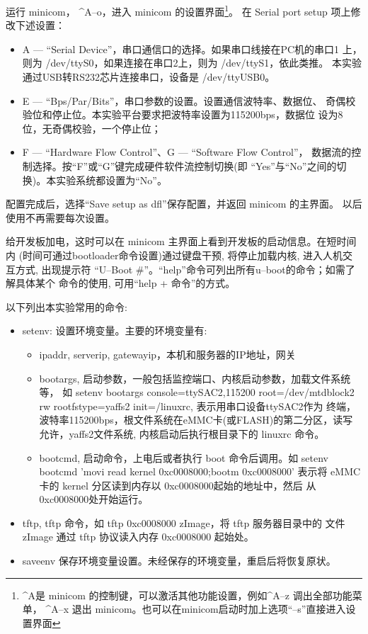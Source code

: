     运行 minicom， \^{}A--o，进入 minicom 的设置界面\footnote{\^{}A是
minicom 的控制键，可以激活其他功能设置，例如\^{}A--z 调出全部功能菜单，
\^{}A--x 退出 minicom。也可以在minicom启动时加上选项``--s''直接进入设置界面}。
在 Serial port setup 项上修改下述设置：
\begin{itemize}\itemsep=-3pt
  \item A --- ``Serial Device''，串口通信口的选择。如果串口线接在PC机的串口1
		上，则为 /dev/ttyS0，如果连接在串口2上，则为 /dev/ttyS1，依此类推。
		本实验通过USB转RS232芯片连接串口，设备是 /dev/ttyUSB0。
  \item E --- ``Bps/Par/Bits''，串口参数的设置。设置通信波特率、数据位、
		奇偶校验位和停止位。本实验平台要求把波特率设置为115200bps，数据位
		设为8位，无奇偶校验，一个停止位；
  \item F --- ``Hardware Flow Control''、G --- ``Software Flow Control''，
		数据流的控制选择。按``F''或``G''键完成硬件软件流控制切换(即
		``Yes''与``No''之间的切换)。本实验系统都设置为``No''。
\end{itemize}

	配置完成后，选择``Save setup as dfl''保存配置，并返回 minicom 的主界面。
以后使用不再需要每次设置。

	给开发板加电，这时可以在 minicom 主界面上看到开发板的启动信息。在短时间内
(时间可通过bootloader命令设置)通过键盘干预, 将停止加载内核, 进入人机交互方式,
出现提示符 ``U--Boot \#''。``help''命令可列出所有u--boot的命令；如需了解具体某个
命令的使用, 可用``help + 命令''的方式。

	以下列出本实验常用的命令:
\begin{itemize}
  \item setenv: 设置环境变量。主要的环境变量有:
  \begin{itemize}
    \item ipaddr, serverip, gatewayip，本机和服务器的IP地址，网关
    \item bootargs, 启动参数，一般包括监控端口、内核启动参数，加载文件系统等，
		如 setenv bootargs console=ttySAC2,115200 root=/dev/mtdblock2 rw
             rootfstype=yaffs2 init=/linuxrc, 表示用串口设备ttySAC2作为
		终端，波特率115200bps，根文件系统在eMMC卡(或FLASH)的第二分区，读写
		允许，yaffs2文件系统, 内核启动后执行根目录下的 linuxrc 命令。
	\item bootcmd, 启动命令，上电后或者执行 boot 命令后调用。如
		setenv bootcmd 'movi read kernel 0xc0008000;bootm 0xc0008000'
		表示将 eMMC 卡的 kernel 分区读到内存以 0xc0008000起始的地址中，然后
		从0xc0008000处开始运行。
  \end{itemize}
  \item tftp, tftp 命令，如 tftp 0xc0008000 zImage，将 tftp 服务器目录中的
        文件 zImage 通过 tftp 协议读入内存 0xc0008000 起始处。
  \item saveenv 保存环境变量设置。未经保存的环境变量，重启后将恢复原状。
\end{itemize}


